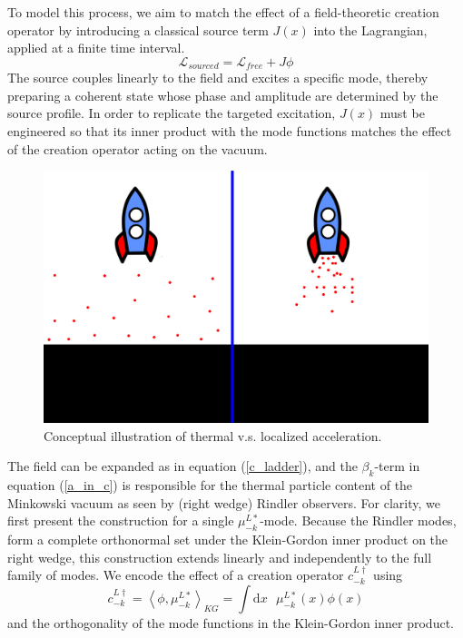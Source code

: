 \documentclass[12pt,a4paper]{article}
\newcommand{\dv}[1]{\mathrm{d} #1 \text{ }}
\begin{document}
To model this process, we aim to match the effect of a field-theoretic creation operator by introducing a classical source term $J(x)$ into the Lagrangian, applied at a finite time interval.
\begin{equation}
\mathscr{L}_{sourced} = \mathscr{L}_{free} + J\phi
\end{equation}
The source couples linearly to the field and excites a specific mode, thereby preparing a coherent state whose phase and amplitude are determined by the source profile. In order to replicate the targeted excitation, $J(x)$ must be engineered so that its inner product with the mode functions matches the effect of the creation operator acting on the vacuum.

\begin{figure}[h]
\centering
\includegraphics[scale=0.5]{rocket_inertial.png}
\caption{Conceptual illustration of thermal v.s. localized acceleration.}
\label{rocket_inertial}
\end{figure}

The field can be expanded as in equation (\ref{c_ladder}), and the $\beta_k$-term in equation (\ref{a_in_c}) is responsible for the thermal particle content of the Minkowski vacuum as seen by (right wedge) Rindler observers. For clarity, we first present the construction for a single $\mu^{L*}_{-k}$-mode. Because the Rindler modes, form a complete orthonormal set under the Klein-Gordon inner product on the right wedge, this construction extends linearly and independently to the full family of modes. We encode the effect of a creation operator $c_{-k}^{L \dagger}$ using
\begin{equation}
  c_{-k}^{L\dagger} = \left<\phi, \mu_{-k}^{L*}\right>_{KG} = \int \dv{x} \mu_{-k}^{L*}(x) \phi(x)
\end{equation}
and the orthogonality of the mode functions in the Klein-Gordon inner product.
\end{document}
